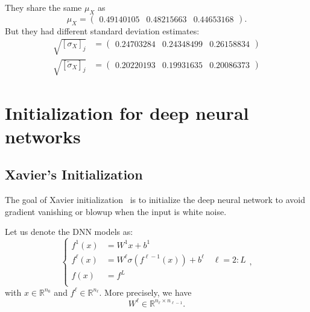 They share the same $\mu_X$ as
\begin{equation}\label{key}
\mu_X = \begin{pmatrix}
0.49140105 & 0.48215663 & 0.44653168
\end{pmatrix}.
\end{equation}
But they had different standard deviation estimates:
\begin{equation}
\begin{aligned}
\sqrt{[\sigma_X]_j} &= \begin{pmatrix}
0.24703284 & 0.24348499 & 0.26158834
\end{pmatrix} \\
\sqrt{[\tilde \sigma_X]_j} &= \begin{pmatrix}
0.20220193 & 0.19931635 & 0.20086373
\end{pmatrix} 
\end{aligned}
\end{equation}

\section{Initialization for deep neural networks}

\subsection{Xavier's Initialization}
The goal of Xavier initialization~\cite{glorot2010understanding} is to initialize the deep neural network to avoid gradient vanishing or blowup when the input is white noise.

Let us denote the DNN models as:
\begin{equation}
\begin{cases}
f^1(x) &= W^1 x + b^1 \\
f^{\ell}(x) &= W^\ell \sigma(f^{\ell-1}(x)) + b^\ell \quad \ell = 2:L \\
f(x) &= f^{L} \\
\end{cases},
\end{equation}
with $x \in \mathbb{R}^{n_0}$ and $f^{\ell} \in \mathbb{R}^{n_\ell}$. More precisely, we have
\begin{equation}\label{key}
W^\ell \in \mathbb{R}^{n_{\ell} \times n_{\ell-1}}.
\end{equation}

